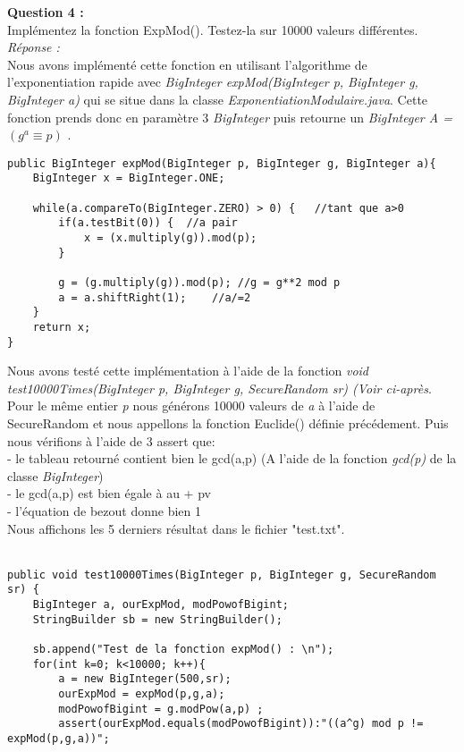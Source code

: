 \documentclass[a4paper,11pt]{article}
\begin{document}
        \textbf{Question 4 : \\}Implémentez la fonction ExpMod(). Testez-la sur 10000 valeurs différentes.
        \textit{\\Réponse :} \\Nous avons implémenté cette fonction en utilisant l'algorithme de l'exponentiation rapide avec \textit{ BigInteger expMod(BigInteger p, BigInteger g, BigInteger a) } qui se situe dans la classe \textit{ExponentiationModulaire.java}. Cette fonction prends donc en paramètre 3 \textit{BigInteger} puis retourne un  \textit{ BigInteger A = $(g^a \equiv p)$} . \\\begin{lstlisting}[caption={Exponentiation rapide}, captionpos=b,breaklines = true]
public BigInteger expMod(BigInteger p, BigInteger g, BigInteger a){
    BigInteger x = BigInteger.ONE;

    while(a.compareTo(BigInteger.ZERO) > 0) {   //tant que a>0
        if(a.testBit(0)) {  //a pair
            x = (x.multiply(g)).mod(p);
        }

        g = (g.multiply(g)).mod(p); //g = g**2 mod p
        a = a.shiftRight(1);    //a/=2
    }
    return x;
}\end{lstlisting}Nous avons testé cette implémentation à l'aide de la fonction \textit{ void test10000Times(BigInteger p, BigInteger g, SecureRandom sr) (Voir ci-après}.\\Pour le même entier \textit{p} nous générons 10000 valeurs de \textit{a} à l'aide de SecureRandom et nous appellons la fonction Euclide() définie précédement. Puis nous vérifions à l'aide de 3 assert que:\\ - le tableau retourné contient bien le gcd(a,p) (A l'aide de la fonction \textit{gcd(p)} de la classe \textit{BigInteger})\\ - le gcd(a,p) est bien égale à au + pv\\ - l'équation de bezout donne bien 1\\ Nous affichons les 5 derniers résultat dans le fichier "test.txt". \\\\\begin{lstlisting}[caption={testExpMod}, captionpos=b,breaklines = true]
public void test10000Times(BigInteger p, BigInteger g, SecureRandom sr) {
    BigInteger a, ourExpMod, modPowofBigint;
    StringBuilder sb = new StringBuilder();

    sb.append("Test de la fonction expMod() : \n");
    for(int k=0; k<10000; k++){
        a = new BigInteger(500,sr);
        ourExpMod = expMod(p,g,a);
        modPowofBigint = g.modPow(a,p) ;
        assert(ourExpMod.equals(modPowofBigint)):"((a^g) mod p != expMod(p,g,a))";


\end{lstlisting}
\end{document}
